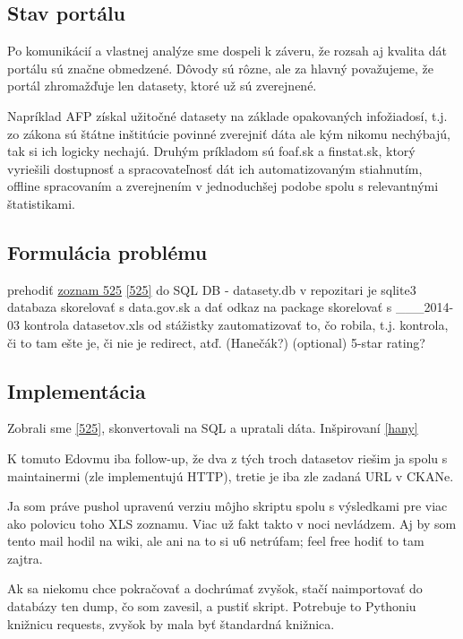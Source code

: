 \documentclass[12pt,a4paper]{article}
\begin{document}
\subsection{Stav portálu} 
Po komunikácií a vlastnej analýze sme dospeli k záveru, že rozsah aj kvalita dát portálu sú značne obmedzené. Dôvody sú rôzne, ale za hlavný považujeme, že portál zhromažďuje len datasety, ktoré už sú zverejnené. 

Napríklad AFP získal užitočné datasety na základe opakovaných infožiadosí, t.j. zo zákona sú štátne inštitúcie povinné zverejniť dáta ale kým nikomu nechýbajú, tak si ich logicky nechajú. Druhým príkladom sú foaf.sk a finstat.sk, ktorý vyriešili dostupnosť a spracovateľnosť dát ich automatizovaným stiahnutím, offline spracovaním a zverejnením v jednoduchšej podobe spolu s relevantnými štatistikami. 

\subsection{Formulácia problému} 

prehodiť \href{http://www.otvorenavlada.gov.sk/datasety-statnej-spravy/}{zoznam 525} \ref{525} do SQL DB - datasety.db v repozitari je sqlite3 databaza
skorelovať s data.gov.sk a dať odkaz na package
skorelovať s \_\_\_2014-03 kontrola datasetov.xls od stážistky
zautomatizovať to, čo robila, t.j. kontrola, či to tam ešte je, či nie je redirect, atď. (Hanečák?)
(optional) 5-star rating?


\subsection{Implementácia}

Zobrali sme \ref{525}, skonvertovali na SQL a upratali dáta. Inšpirovaní \ref{hany}  

K tomuto Edovmu iba follow-up, že dva z tých troch datasetov riešim ja spolu s maintainermi (zle implementujú HTTP), tretie je iba zle zadaná URL v CKANe.

Ja som práve pushol upravenú verziu môjho skriptu spolu s výsledkami pre viac ako polovicu toho XLS zoznamu. Viac už fakt takto v noci nevládzem. Aj by som tento mail hodil na wiki, ale ani na to si u6 netrúfam; feel free hodiť to tam zajtra.

Ak sa niekomu chce pokračovať a dochrúmať zvyšok, stačí naimportovať do databázy ten dump, čo som zavesil, a pustiť skript. Potrebuje to Pythoniu knižnicu requests, zvyšok by mala byť štandardná knižnica.
\end{document}
